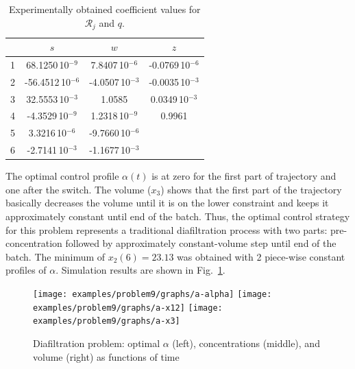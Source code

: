 \begin{table}
  \caption{Experimentally obtained coefficient values for $\mathcal{R}_j$ and $q$.}
  \label{tab:coefficients}
  \centering
  \begin{tabular}{lccc}
    & $s$ & $w$ & $z$ \\ \hline
1  &68.1250\,10$^{-9}$ &7.8407\,10$^{-6}$ &  -0.0769\,10$^{-6}$\\
2  &-56.4512\,10$^{-6}$ &-4.0507\,10$^{-3}$ & -0.0035\,10$^{-3}$ \\
3  & 32.5553\,10$^{-3}$& 1.0585&  0.0349\,10$^{-3}$\\
4  & -4.3529\,10$^{-9}$& 1.2318\,10$^{-9}$& 0.9961 \\
5  & 3.3216\,10$^{-6}$& -9.7660\,10$^{-6}$&  \\
6  & -2.7141\,10$^{-3}$& -1.1677\,10$^{-3}$&  \\
  \end{tabular}
\end{table}

The optimal control profile $\alpha(t)$ is at zero for the first part
of trajectory and one after the switch.  The volume ($x_3$) shows that
the first part of the trajectory basically decreases the volume until
it is on the lower constraint and keeps it approximately constant
until end of the batch. Thus, the optimal control strategy for this
problem represents a traditional diafiltration process with two parts:
pre-concentration followed by approximately constant-volume step until
end of the batch.  The minimum of $x_2(6) = 23.13$ was obtained with
2 piece-wise constant profiles of $\alpha$. Simulation results are
shown in Fig.~\ref{fig:problem-a}.

\begin{figure}[!h]
  \centering
  \texttt{[image: examples/problem9/graphs/a-alpha]}
  \texttt{[image: examples/problem9/graphs/a-x12]} 
  \texttt{[image: examples/problem9/graphs/a-x3]}
  \caption{Diafiltration problem: optimal $\alpha$ (left),
    concentrations (middle), and volume (right) as functions of time}
  \label{fig:problem-a}
\end{figure}

